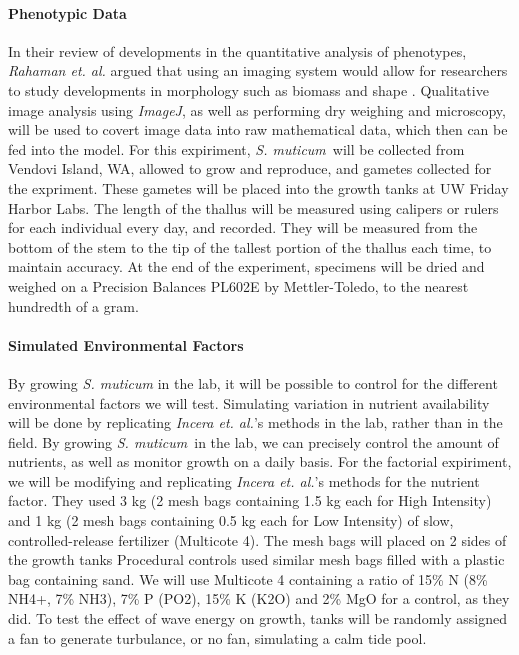 \documentclass[12pt]{extarticle}
\newcommand\x{\textit{S. muticum}}
\begin{document}
\paragraph{Phenotypic Data}
In their review of developments in the quantitative analysis of phenotypes, \textit{Rahaman et. al.} argued that using an imaging system would allow for researchers to study developments in morphology such as biomass and shape \cite{10.3389/fpls.2015.00619}. Qualitative image analysis using \textit{ImageJ}, as well as performing dry weighing and microscopy, will be used to covert image data into raw mathematical data, which then can be fed into the model. For this expiriment, \x\ will be collected from Vendovi Island, WA, allowed to grow and reproduce, and gametes collected for the expriment. These gametes will be placed into the growth tanks at UW Friday Harbor Labs. The length of the thallus will be measured using calipers or rulers for each individual every day, and recorded. They will be measured from the bottom of the stem to the tip of the tallest portion of the thallus each time, to maintain accuracy. At the end of the experiment, specimens will be dried and weighed on a Precision Balances PL602E\textsuperscript{\textcopyright} by Mettler-Toledo, to the nearest hundredth of a gram.
\paragraph{Simulated Environmental Factors} By growing \textit{S. muticum} in the lab, it will be possible to control for the different environmental factors we will test. Simulating variation in nutrient availability will be done by replicating \textit{Incera et. al.}'s \cite{Incera2009} methods in the lab, rather than in the field. By growing \x\ in the lab, we can precisely control the amount of nutrients, as well as monitor growth on a daily basis. For the factorial expiriment, we will be modifying and replicating \textit{Incera et. al.}'s methods for the nutrient factor. They used 3 kg (2 mesh bags containing 1.5 kg each for High Intensity) and 1 kg
(2 mesh bags containing 0.5 kg each for Low Intensity) of slow,
controlled-release fertilizer (Multicote \textsuperscript{\textregistered} 4). The mesh bags will placed on 2 sides of the growth tanks Procedural controls used similar mesh bags filled
with a plastic bag containing sand. We will use Multicote\textsuperscript{\textregistered}
4 containing a ratio of 15\%  N (8\% NH4+, 7\% NH3), 7\%
P (PO2), 15\% K (K2O) and 2\% MgO for a control, as they did. To test the effect of wave energy on growth, tanks will be randomly assigned a fan to generate turbulance, or no fan, simulating a calm tide pool.
\end{document}
